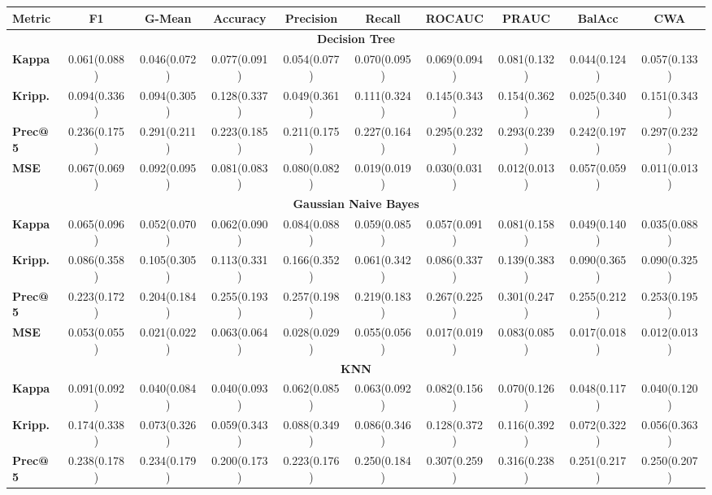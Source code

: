 \documentclass{article}
\begin{document}
\begin{sidewaystable}[!htbp]
\centering
\small
\begin{tabular}{@{}lccccccccc@{}}
\toprule
\textbf{Metric} & \textbf{F1} & \textbf{G-Mean} & \textbf{Accuracy} & \textbf{Precision} & \textbf{Recall} & \textbf{ROCAUC} & \textbf{PRAUC} & \textbf{BalAcc} & \textbf{CWA} \\
\midrule
\multicolumn{10}{c}{\textbf{Decision Tree}}\\
\midrule
\textbf{Kappa} & 0.061(0.088) & 0.046(0.072) & 0.077(0.091) & 0.054(0.077) & 0.070(0.095) & 0.069(0.094) & 0.081(0.132) & 0.044(0.124) & 0.057(0.133) \\
\textbf{Kripp.} & 0.094(0.336) & 0.094(0.305) & 0.128(0.337) & 0.049(0.361) & 0.111(0.324) & 0.145(0.343) & 0.154(0.362) & 0.025(0.340) & 0.151(0.343) \\
\textbf{Prec@5} & 0.236(0.175) & 0.291(0.211) & 0.223(0.185) & 0.211(0.175) & 0.227(0.164) & 0.295(0.232) & 0.293(0.239) & 0.242(0.197) & 0.297(0.232) \\
\textbf{MSE} & 0.067(0.069) & 0.092(0.095) & 0.081(0.083) & 0.080(0.082) & 0.019(0.019) & 0.030(0.031) & 0.012(0.013) & 0.057(0.059) & 0.011(0.013) \\
\midrule
\multicolumn{10}{c}{\textbf{Gaussian Naive Bayes}}\\
\midrule
\textbf{Kappa} & 0.065(0.096) & 0.052(0.070) & 0.062(0.090) & 0.084(0.088) & 0.059(0.085) & 0.057(0.091) & 0.081(0.158) & 0.049(0.140) & 0.035(0.088) \\
\textbf{Kripp.} & 0.086(0.358) & 0.105(0.305) & 0.113(0.331) & 0.166(0.352) & 0.061(0.342) & 0.086(0.337) & 0.139(0.383) & 0.090(0.365) & 0.090(0.325) \\
\textbf{Prec@5} & 0.223(0.172) & 0.204(0.184) & 0.255(0.193) & 0.257(0.198) & 0.219(0.183) & 0.267(0.225) & 0.301(0.247) & 0.255(0.212) & 0.253(0.195) \\
\textbf{MSE} & 0.053(0.055) & 0.021(0.022) & 0.063(0.064) & 0.028(0.029) & 0.055(0.056) & 0.017(0.019) & 0.083(0.085) & 0.017(0.018) & 0.012(0.013) \\
\midrule
\multicolumn{10}{c}{\textbf{KNN}}\\
\midrule
\textbf{Kappa} & 0.091(0.092) & 0.040(0.084) & 0.040(0.093) & 0.062(0.085) & 0.063(0.092) & 0.082(0.156) & 0.070(0.126) & 0.048(0.117) & 0.040(0.120) \\
\textbf{Kripp.} & 0.174(0.338) & 0.073(0.326) & 0.059(0.343) & 0.088(0.349) & 0.086(0.346) & 0.128(0.372) & 0.116(0.392) & 0.072(0.322) & 0.056(0.363) \\
\textbf{Prec@5} & 0.238(0.178) & 0.234(0.179) & 0.200(0.173) & 0.223(0.176) & 0.250(0.184) & 0.307(0.259) & 0.316(0.238) & 0.251(0.217) & 0.250(0.207) \\

\end{tabular}
\end{sidewaystable}
\end{document}

